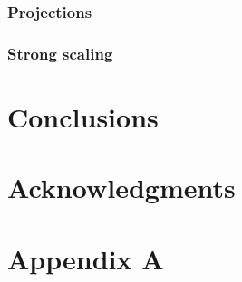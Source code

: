 \documentclass{sig-alternate}
\begin{document}

\subsubsection{Projections}

\subsubsection{Strong scaling}






\section{Conclusions}

\section{Acknowledgments}

%

%
%
\appendix
\section{Appendix A}

\end{document}
